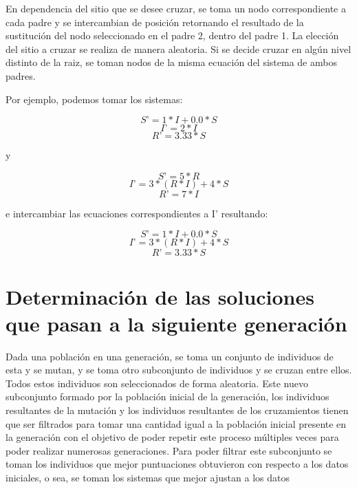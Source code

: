 En dependencia del sitio que se desee cruzar, se toma un nodo correspondiente a cada padre y se intercambian de posición retornando el resultado de la sustitución del nodo seleccionado en el padre 2, dentro del padre 1. La elección del sitio a cruzar se realiza de manera aleatoria. Si se decide cruzar en algún nivel distinto de la raiz, se toman nodos de la misma ecuación del sistema de ambos padres.

Por ejemplo, podemos tomar los sistemas:

$$S’ = 1 * I + 0.0 * S$$
$$I’ = 2 * I$$
$$R’ = 3.33 * S$$

y

$$S’ = 5 * R$$
$$I’ = 3 * (R * I) + 4 * S$$
$$R’ = 7 * I$$

e intercambiar las ecuaciones correspondientes a I’ resultando:

$$S’ = 1 * I + 0.0 * S$$
$$I’ = 3 * (R * I) + 4 * S$$
$$R’ = 3.33 * S$$

\section{Determinación de las soluciones que pasan a la siguiente generación}

Dada una población en una generación, se toma un conjunto de individuos de esta y se mutan, y se toma otro subconjunto de individuos y se cruzan entre ellos. Todos estos individuos son seleccionados de forma aleatoria. Este nuevo subconjunto formado por la población inicial de la generación, los individuos resultantes de la mutación y los individuos resultantes de los cruzamientos tienen que ser filtrados para tomar una cantidad igual a la población inicial presente en la generación con el objetivo de poder repetir este proceso múltiples veces para poder realizar numerosas generaciones. Para poder filtrar este subconjunto se toman los individuos que mejor puntuaciones obtuvieron con respecto a los datos iniciales, o sea, se toman los sistemas que mejor ajustan a los datos